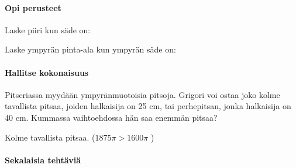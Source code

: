 \begin{tehtavasivu}

\paragraph*{Opi perusteet}

\begin{tehtava}
Laske piiri kun säde on:
\begin{alakohdat}
\end{alakohdat}
\begin{vastaus}
\begin{alakohdat}
\end{alakohdat}
\end{vastaus}
\end{tehtava}

\begin{tehtava}
Laske ympyrän pinta-ala kun ympyrän säde on:
\begin{alakohdat}
\end{alakohdat}

\begin{vastaus}
\begin{alakohdat}
\end{alakohdat}
\end{vastaus}
\end{tehtava}


\paragraph*{Hallitse kokonaisuus}

\begin{tehtava}
Pitseriassa myydään ympyränmuotoisia pitsoja. Grigori voi ostaa joko kolme tavallista pitsaa, joiden halkaisija on 25 cm, tai perhepitsan, jonka halkaisija on 40 cm. Kummassa vaihtoehdossa hän saa enemmän pitsaa?

\begin{vastaus}
Kolme tavallista pitsaa. ($1875 \pi > 1600 \pi$ )
\end{vastaus}
\end{tehtava}

\paragraph*{Sekalaisia tehtäviä}

\end{tehtavasivu}
